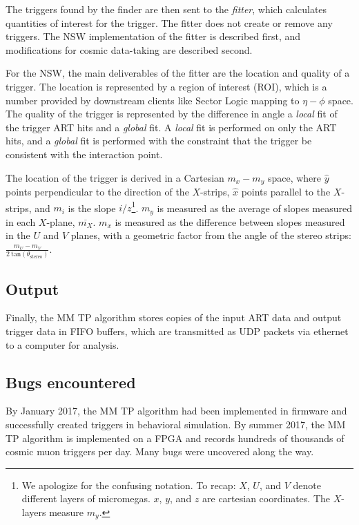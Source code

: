 The triggers found by the finder are then sent to the \textit{fitter}, which calculates quantities of interest for the trigger. The fitter does not create or remove any triggers. The NSW implementation of the fitter is described first, and modifications for cosmic data-taking are described second.

For the NSW, the main deliverables of the fitter are the location and quality of a trigger. The location is represented by a region of interest (ROI), which is a number provided by downstream clients like Sector Logic mapping to $\eta-\phi$ space. The quality of the trigger is represented by the difference in angle a \textit{local} fit of the trigger ART hits and a \textit{global} fit. A \textit{local} fit is performed on only the ART hits, and a \textit{global} fit is performed with the constraint that the trigger be consistent with the interaction point.

The location of the trigger is derived in a Cartesian $m_x-m_y$ space, where $\hat{y}$ points perpendicular to the direction of the $X$-strips, $\hat{x}$ points parallel to the $X$-strips, and $m_i$ is the slope $i/z$\footnote{We apologize for the confusing notation. To recap: $X$, $U$, and $V$ denote different layers of micromegas. $x$, $y$, and $z$ are cartesian coordinates. The $X$-layers measure $m_y$.}. $m_y$ is measured as the average of slopes measured in each $X$-plane, $\overline{m_X}$. $m_x$ is measured as the difference between slopes measured in the $U$ and $V$ planes, with a geometric factor from the angle of the stereo strips: $\frac{m_U - m_V}{2\ \text{tan}(\theta_\text{stereo})}$.

\subsection{Output}
\label{sec:alg-output}

Finally, the MM TP algorithm stores copies of the input ART data and output trigger data in FIFO buffers, which are transmitted as UDP packets via ethernet to a computer for analysis.

\subsection{Bugs encountered}
\label{sec:alg-bugs}

By January 2017, the MM TP algorithm had been implemented in firmware and successfully created triggers in behavioral simulation. By summer 2017, the MM TP algorithm is implemented on a FPGA and records hundreds of thousands of cosmic muon triggers per day. Many bugs were uncovered along the way.


